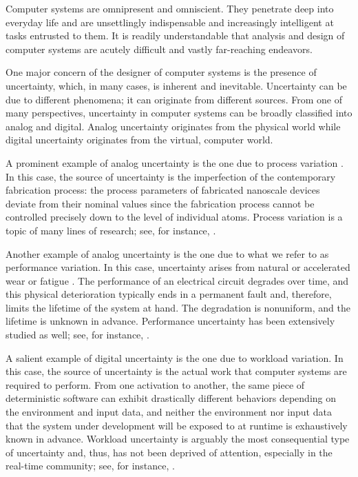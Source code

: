 Computer systems are omnipresent and omniscient. They penetrate deep into
everyday life and are unsettlingly indispensable and increasingly intelligent at
tasks entrusted to them. It is readily understandable that analysis and design
of computer systems are acutely difficult and vastly far-reaching endeavors.

One major concern of the designer of computer systems is the presence of
uncertainty, which, in many cases, is inherent and inevitable. Uncertainty can
be due to different phenomena; it can originate from different sources. From one
of many perspectives, uncertainty in computer systems can be broadly classified
into analog and digital. Analog uncertainty originates from the physical world
while digital uncertainty originates from the virtual, computer world.

A prominent example of analog uncertainty is the one due to process variation
\cite{srivastava2010}. In this case, the source of uncertainty is the
imperfection of the contemporary fabrication process: the process parameters of
fabricated nanoscale devices deviate from their nominal values since the
fabrication process cannot be controlled precisely down to the level of
individual atoms. Process variation is a topic of many lines of research; see,
for instance, \cite{bhardwaj2006, bhardwaj2008, chandra2010, juan2012, lee2013}.

Another example of analog uncertainty is the one due to what we refer to as
performance variation. In this case, uncertainty arises from natural or
accelerated wear or fatigue \cite{jedec2016}. The performance of an electrical
circuit degrades over time, and this physical deterioration typically ends in a
permanent fault and, therefore, limits the lifetime of the system at hand. The
degradation is nonuniform, and the lifetime is unknown in advance. Performance
uncertainty has been extensively studied as well; see, for instance,
\cite{coskun2006, huang2009b, das2014c}.

A salient example of digital uncertainty is the one due to workload variation.
In this case, the source of uncertainty is the actual work that computer systems
are required to perform. From one activation to another, the same piece of
deterministic software can exhibit drastically different behaviors depending on
the environment and input data, and neither the environment nor input data that
the system under development will be exposed to at runtime is exhaustively known
in advance. Workload uncertainty is arguably the most consequential type of
uncertainty and, thus, has not been deprived of attention, especially in the
real-time community; see, for instance, \cite{diaz2002, santinelli2011,
quinton2012, tanasa2015}.

